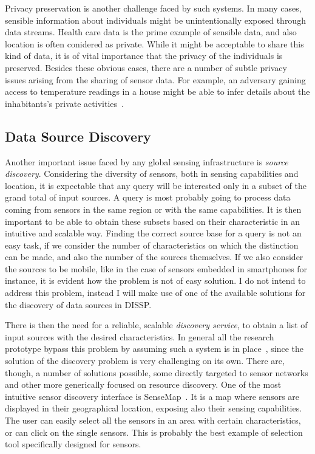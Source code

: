 
Privacy preservation is another challenge faced by such systems. In many cases, sensible information about individuals
might be unintentionally exposed through data streams. Health care data is the prime example of sensible data, and also location is often conidered as private.
While it might be acceptable to share this kind of data, it is of vital importance that the privacy of the
individuals is preserved. Besides these obvious cases, there are a number of subtle privacy issues arising from the
sharing of sensor data. For example, an adversary gaining access to temperature readings in a house might be able to
infer details about the inhabitants's private activities~\cite{temp-privacy}. 


\subsection{Data Source Discovery}
\label{sec:source_discovery}
Another important issue faced by any global sensing infrastructure is \textit{source discovery}. Considering the
diversity of sensors, both in sensing capabilities and location, it is expectable that any query will be
interested only in a subset of the grand total of input sources. A query is most probably going to process data coming
from sensors in the same region or with the same capabilities. It is then important to be able to obtain these subsets
based on their characteristic in an intuitive and scalable way. Finding the correct source base for a query is not an
easy task, if we consider the number of characteristics on which the distinction can be made, and also the number of the
sources themselves. If we also consider the sources to be mobile, like in the case of sensors embedded in smartphones
for instance, it is evident how the problem is not of easy solution. I do not intend to address this problem, instead I
will make use of one of the available solutions for the discovery of data sources in DISSP.

There is then the need for a reliable, scalable \textit{discovery service}, to obtain a list of input sources with the
desired characteristics.  In general all the research prototype bypass
this problem by assuming such a system is in place~\cite{borealis-design, stream, mortar-long}, since the solution of the discovery problem is very challenging on
its own. There are, though, a number of solutions possible, some directly targeted to sensor networks and other more
generically focused on resource discovery. One of the most intuitive sensor discovery interface is SenseMap~\cite{sensemap}. 
It is a map where sensors are displayed in their geographical location, exposing also their sensing capabilities. The
user can easily select all the sensors in an area with certain characteristics, or can click on the single sensors.
This is probably the best example of selection tool specifically designed for sensors. 

